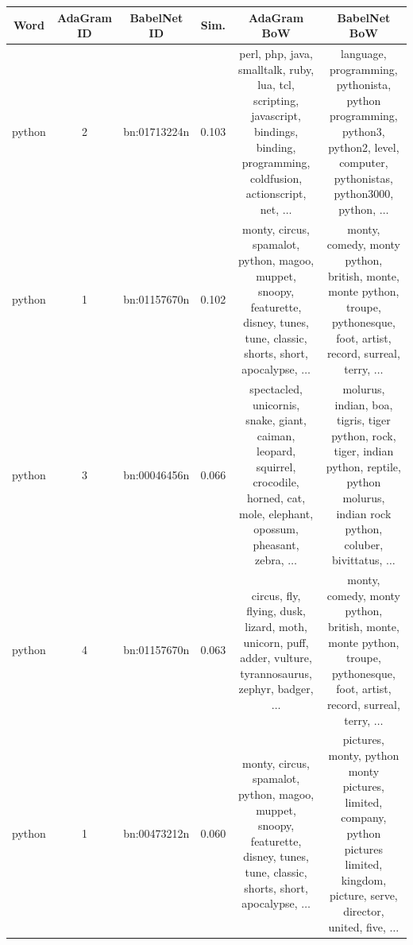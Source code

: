 \documentclass[10pt, a4paper]{article}
\begin{document}
\begin{table}

\footnotesize  
\begin{center}
\begin{tabular}{cccccc}

\bf Word & \bf AdaGram ID & \bf BabelNet ID & \bf Sim. & \bf AdaGram BoW & \bf BabelNet BoW  \\
\hline

python & 2 & bn:01713224n & 0.103   & \parbox{4.6cm}{perl, php, java, smalltalk, ruby, lua, tcl, scripting, javascript, bindings, binding, programming, coldfusion, actionscript, net, $\ldots$} &  \parbox{4.6cm}{ language, programming, pythonista,  python programming, python3, python2, level, computer, pythonistas, python3000, python, $\ldots$ }\\ \hline

python & 1 & bn:01157670n &  0.102  & \parbox{4.6cm}{monty, circus, spamalot, python, magoo, muppet, snoopy, featurette, disney, tunes, tune, classic, shorts, short, apocalypse, $\ldots$} &  \parbox{4.6cm}{monty, comedy, monty python, british, monte, monte python, troupe, pythonesque, foot, artist, record, surreal, terry, $\ldots$ }\\ \hline

python & 3 & bn:00046456n &  0.066  & \parbox{4.6cm}{spectacled, unicornis, snake, giant, caiman, leopard, squirrel, crocodile, horned, cat, mole, elephant, opossum, pheasant, zebra, $\ldots$} &  \parbox{4.6cm}{molurus, indian, boa, tigris, tiger python, rock, tiger, indian python, reptile, python molurus, indian rock python, coluber, bivittatus, $\ldots$ }\\ \hline

python & 4 & bn:01157670n &  0.063  & \parbox{4.6cm}{circus, fly, flying, dusk, lizard, moth, unicorn, puff, adder, vulture, tyrannosaurus, zephyr, badger, $\ldots$} &  \parbox{4.6cm}{monty, comedy, monty python, british, monte, monte python, troupe, pythonesque, foot, artist, record, surreal, terry, $\ldots$ }\\ \hline

python & 1 & bn:00473212n & 0.060   & \parbox{4.6cm}{monty, circus, spamalot, python, magoo, muppet, snoopy, featurette, disney, tunes, tune, classic, shorts, short, apocalypse, $\ldots$} &  \parbox{4.6cm}{pictures, monty, python monty pictures, limited, company, python pictures limited, kingdom, picture, serve, director, united, five, $\ldots$}\\ \hline


\end{tabular}
\end{center}
\end{table}
\end{document}
